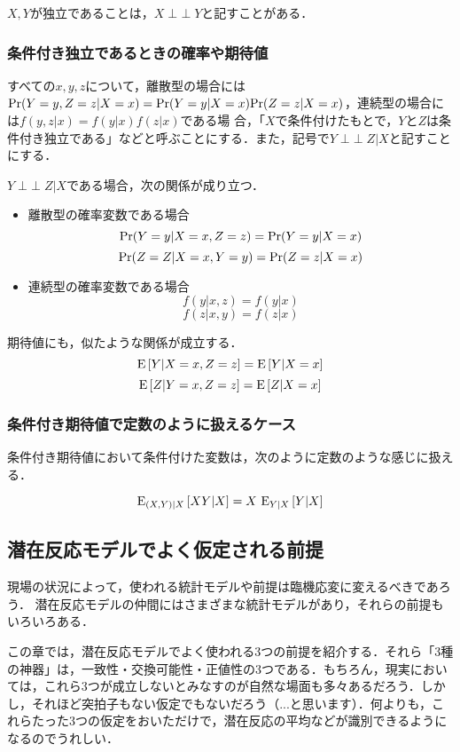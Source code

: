 \documentclass[12pt]{jsarticle}
\newcommand{\indep}{\mathop{\perp\!\!\!\perp}}
\begin{document}
$X, Y$が独立であることは，$X \indep Y$と記すことがある．


\subsubsection{条件付き独立であるときの確率や期待値}\label{sec:condindexp}
すべての$x, y, z$について，離散型の場合には${\rm Pr}(Y=y, Z=z|X = x) = {\rm Pr}(Y=y|X=x) {\rm Pr}(Z=z|X=x)$，連続型の場合には$f(y,z|x) = f(y|x) f(z|x)$である場
合，「$X$で条件付けたもとで，$Y$と$Z$は条件付き独立である」などと呼ぶことにする．また，記号で$Y \indep Z|X$と記すことにする．

$Y \indep Z|X$である場合，次の関係が成り立つ．
\begin{itemize}
\item 離散型の確率変数である場合
\[
{\rm Pr}(Y = y|X = x, Z = z) ={\rm Pr}(Y=y|X = x)
\]
\[
{\rm Pr}(Z = Z|X = x, Y = y) ={\rm Pr}(Z=z|X = x)
\]
\item 連続型の確率変数である場合
\[
f(y|x, z) = f(y|x)
\]
\[
f(z|x, y) = f(z|x)
\]
\end{itemize}

期待値にも，似たような関係が成立する．
\[
{\rm E}\left[  Y|X = x, Z = z    \right] =  {\rm E}\left[  Y|X = x    \right] 
\]
\[
{\rm E}\left[  Z|Y = x, Z = z    \right] =  {\rm E}\left[  Z|X = x    \right] 
\]

\subsubsection{条件付き期待値で定数のように扱えるケース}\label{sec:constexp}

条件付き期待値において条件付けた変数は，次のように定数のような感じに扱える．

\[
{\rm E}_{(X,Y)|X}\left[X Y| X\right] = X \ {\rm E}_{Y|X}\left[Y| X\right] 
\]


\subsection{潜在反応モデルでよく仮定される前提}

現場の状況によって，使われる統計モデルや前提は臨機応変に変えるべきであろう．
潜在反応モデルの仲間にはさまざまな統計モデルがあり，それらの前提もいろいろある．

この章では，潜在反応モデルでよく使われる3つの前提を紹介する．それら「3種の神器」は，一致性・交換可能性・正値性の3つである．もちろん，現実においては，これら3つが成立しないとみなすのが自然な場面も多々あるだろう．しかし，それほど突拍子もない仮定でもないだろう（...と思います）．何よりも，これらたった3つの仮定をおいただけで，潜在反応の平均などが識別できるようになるのでうれしい．
\end{document}
